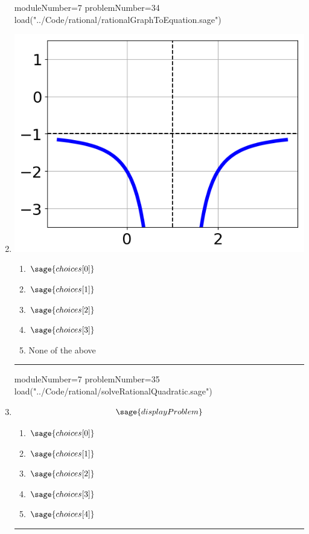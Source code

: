 \documentclass[14pt]{article}
\newcommand{\litem}[1]{\item#1\hspace*{-1cm}\rule{\textwidth}{0.4pt}}
\begin{document}
\begin{enumerate}
\begin{sagesilent}
moduleNumber=7
problemNumber=34
load("../Code/rational/rationalGraphToEquation.sage")
\end{sagesilent}

\litem{ 

\begin{multicols}{2}
\begin{center}
\includegraphics[width=.3\textwidth]{../Figures/rationalGraphToEquationB.png}
\end{center}

\columnbreak

	\begin{enumerate}[label=\Alph*.]
		\item \( \sage{choices[0]} \)
		\item \( \sage{choices[1]} \)
		\item \( \sage{choices[2]} \)
		\item \( \sage{choices[3]} \)
    \item None of the above
	\end{enumerate}
\end{multicols}
}

\begin{sagesilent}
moduleNumber=7
problemNumber=35
load("../Code/rational/solveRationalQuadratic.sage")
\end{sagesilent}

\litem{ 

	\[ \sage{displayProblem} \]

	\begin{enumerate}[label=\Alph*.]
    \item \( \sage{choices[0]} \)
    \item \( \sage{choices[1]} \)
    \item \( \sage{choices[2]} \)
    \item \( \sage{choices[3]} \)
    \item \( \sage{choices[4]} \)
	\end{enumerate}
}

\end{enumerate}
\end{document}
